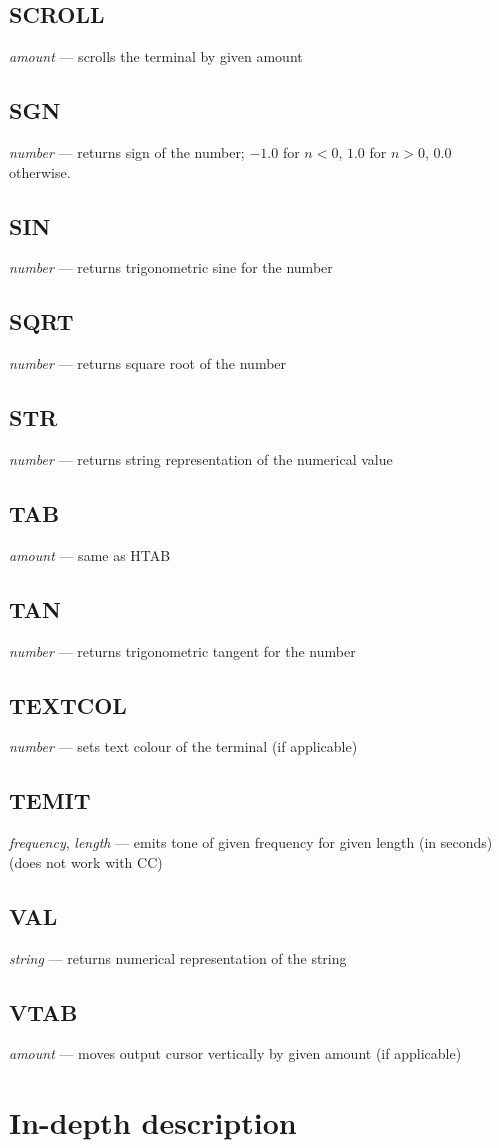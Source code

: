 \subsection{SCROLL} \emph{amount} --- scrolls the terminal by given amount
\subsection{SGN} \emph{number} --- returns sign of the number; $ -1.0 $ for $ n < 0 $, $ 1.0 $ for $ n > 0 $, $ 0.0 $ otherwise.
\subsection{SIN} \emph{number} --- returns trigonometric sine for the number
\subsection{SQRT} \emph{number} --- returns square root of the number
\subsection{STR} \emph{number} --- returns string representation of the numerical value
\subsection{TAB} \emph{amount} --- same as HTAB
\subsection{TAN} \emph{number} --- returns trigonometric tangent for the number
\subsection{TEXTCOL} \emph{number} --- sets text colour of the terminal (if applicable)
\subsection{TEMIT} \emph{frequency}, \emph{length} --- emits tone of given frequency for given length (in seconds) (does not work with CC)
\subsection{VAL} \emph{string} --- returns numerical representation of the string
\subsection{VTAB} \emph{amount} --- moves output cursor vertically by given amount (if applicable)

\section{In-depth description}